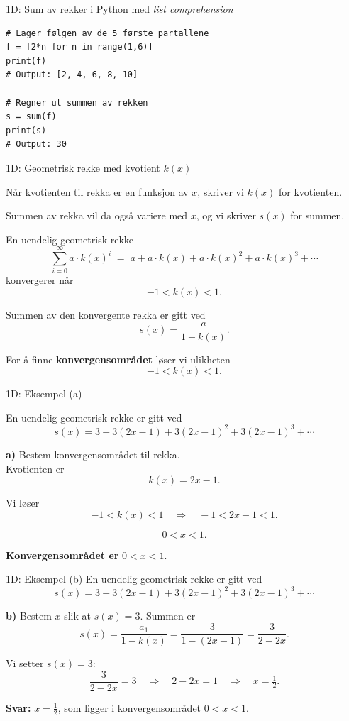 \blueheader
\begin{frame}[fragile]{1D: Sum av rekker i Python med \emph{list comprehension}}
\warn
\begin{verbatim}
# Lager følgen av de 5 første partallene
f = [2*n for n in range(1,6)]
print(f)
# Output: [2, 4, 6, 8, 10]

# Regner ut summen av rekken
s = sum(f)
print(s)
# Output: 30
\end{verbatim}
\end{frame}




\redheader
\begin{frame}{1D: Geometrisk rekke med kvotient $k(x)$}

Når kvotienten til rekka er en funksjon av $x$, skriver vi $k(x)$ for kvotienten.  

\medskip
Summen av rekka vil da også variere med $x$, og vi skriver $s(x)$ for summen.  

\medskip
En uendelig geometrisk rekke
\[
\sum_{i=0}^{\infty} a \cdot k(x)^i \;=\; a + a\cdot k(x) + a\cdot k(x)^2 + a\cdot k(x)^3 + \cdots
\]
konvergerer når
\[
-1 < k(x) < 1.
\]

Summen av den konvergente rekka er gitt ved
\[
s(x) = \frac{a}{1-k(x)}.
\]

\medskip
For å finne \textbf{konvergensområdet} løser vi ulikheten
\[
-1 < k(x) < 1.
\]

\end{frame}

\greenheader
\begin{frame}{1D: Eksempel (a)}

En uendelig geometrisk rekke er gitt ved
\[
s(x) = 3 + 3(2x-1) + 3(2x-1)^2 + 3(2x-1)^3 + \cdots
\]

\textbf{a)} Bestem konvergensområdet til rekka.\\

\medskip
Kvotienten er 
\[
k(x) = 2x - 1.
\]

Vi løser
\[
-1 < k(x) < 1 \quad \Longrightarrow \quad -1 < 2x-1 < 1.
\]

\[
0 < x < 1.
\]

\textbf{Konvergensområdet er } $0 < x < 1$.
\end{frame}


\greenheader
\begin{frame}{1D: Eksempel (b)}
En uendelig geometrisk rekke er gitt ved
\[
s(x) = 3 + 3(2x-1) + 3(2x-1)^2 + 3(2x-1)^3 + \cdots
\]

\textbf{b)} Bestem $x$ slik at $s(x) = 3$.
Summen er
\[
s(x) =\frac{a_1}{1-k(x)}= \frac{3}{1-(2x-1)} = \frac{3}{2-2x}.
\]


Vi setter $s(x) = 3$:
\[
\frac{3}{2-2x} = 3 \quad \Longrightarrow \quad 2-2x = 1 \quad \Longrightarrow \quad x=\tfrac12.
\]

\textbf{Svar:} $x = \tfrac12$, som ligger i konvergensområdet $0<x<1$.
\end{frame}

